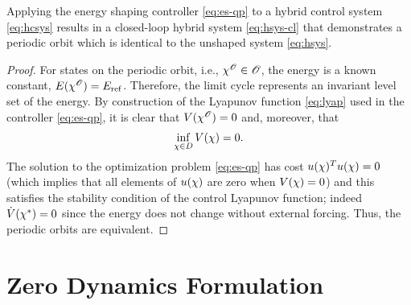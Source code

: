 \begin{lemma}
  Applying the energy shaping controller \eqref{eq:es-qp} to a hybrid control system \eqref{eq:hcsys} results in a closed-loop hybrid system \eqref{eq:hsys-cl} that demonstrates a periodic orbit which is identical to the unshaped system \eqref{eq:hsys}.\vgap
\end{lemma}

\begin{proof}
  For states on the periodic orbit, i.e., $\chi^{\mathscr{O}} \in \mathscr{O}$, the energy is a known constant, $E(\chi^{\mathscr{O}}) = E_{\mathrm{ref}}$.
  Therefore, the limit cycle represents an invariant level set of the energy.
  By construction of the Lyapunov function \eqref{eq:lyap} used in the controller \eqref{eq:es-qp}, it is clear that $V(\chi^{\mathscr{O}}) = 0$ and, moreover, that
  \begin{align}
    \inf_{\chi \in D} V(\chi) = 0.
  \end{align}
  The solution to the optimization problem \eqref{eq:es-qp} has cost $u(\chi)^T u(\chi) = 0$ (which implies that all elements of $u(\chi)$ are zero when $V(\chi) = 0$) and this satisfies the stability condition of the control Lyapunov function;
  indeed ${\dot V}(\chi^{*}) = 0$ since the energy does not change without external forcing.
  Thus, the periodic orbits are equivalent.
\end{proof}

\section{Zero Dynamics Formulation} \label{sec:zd-form}

